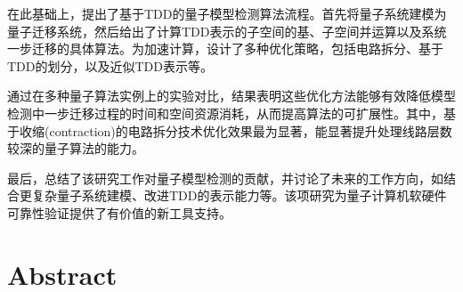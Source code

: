 在此基础上，提出了基于TDD的量子模型检测算法流程。首先将量子系统建模为量子迁移系统，然后给出了计算TDD表示的子空间的基、子空间并运算以及系统一步迁移的具体算法。为加速计算，设计了多种优化策略，包括电路拆分、基于TDD的划分，以及近似TDD表示等。

通过在多种量子算法实例上的实验对比，结果表明这些优化方法能够有效降低模型检测中一步迁移过程的时间和空间资源消耗，从而提高算法的可扩展性。其中，基于收缩(contraction)的电路拆分技术优化效果最为显著，能显著提升处理线路层数较深的量子算法的能力。

最后，总结了该研究工作对量子模型检测的贡献，并讨论了未来的工作方向，如结合更复杂量子系统建模、改进TDD的表示能力等。该项研究为量子计算机软硬件可靠性验证提供了有价值的新工具支持。

\intobmk\chapter*{Abstract}%



